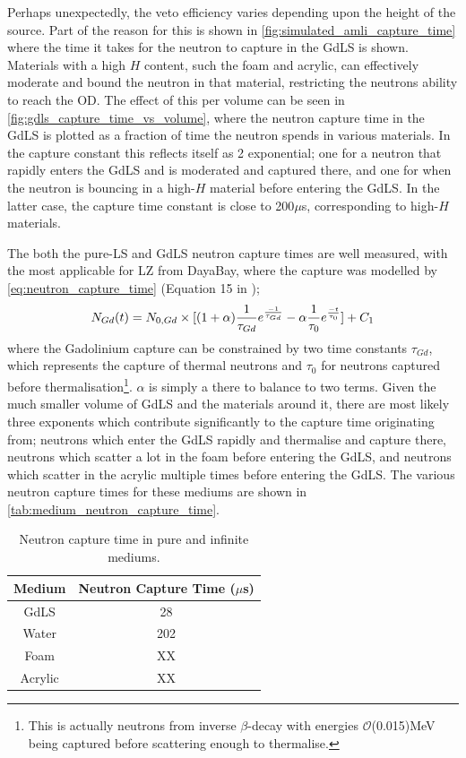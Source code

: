 \par
Perhaps unexpectedly, the veto efficiency varies depending upon the height of the source.
Part of the reason for this is shown in \autoref{fig:simulated_amli_capture_time} where the time it takes for the neutron to capture in the GdLS is shown.
Materials with a high $H$ content, such the foam and acrylic, can effectively moderate and bound the neutron in that material, restricting the neutrons ability to reach the OD.
The effect of this per volume can be seen in \autoref{fig:gdls_capture_time_vs_volume}, where the neutron capture time in the GdLS is plotted as a fraction of time the neutron spends in various materials.
In the capture constant this reflects itself as 2 exponential; one for a neutron that rapidly enters the GdLS and is moderated and captured there, and one for when the neutron is bouncing in a high-$H$ material before entering the GdLS.
In the latter case, the capture time constant is close to 200$\mu$s, corresponding to high-$H$ materials.
\par
The both the pure-LS and GdLS neutron capture times are well measured, with the most applicable for LZ from DayaBay, where the capture was modelled by \autoref{eq:neutron_capture_time} (Equation 15 in \cite{Dayabay_neutron_capture_fit_ref});
\begin{equation}
    N_{Gd}(t) = N_{0,Gd} \times [(1+\alpha)\frac{1}{\tau_{Gd}}e^{\frac{-1}{\tau_{Gd}}} - \alpha\frac{1}{\tau_{0}}e^{\frac{-t}{\tau_{0}}}] + C_{1} \\
\label{eq:neutron_capture_time}
\end{equation}
where the Gadolinium capture can be constrained by two time constants $\tau_{Gd}$, which represents the capture of thermal neutrons and $\tau_{0}$ for neutrons captured before thermalisation\footnote{This is actually neutrons from inverse $\beta$-decay with energies $\mathcal{O}$(0.015)MeV being captured before scattering enough to thermalise.}. 
$\alpha$ is simply a there to balance to two terms.
Given the much smaller volume of GdLS and the materials around it, there are most likely three exponents which contribute significantly to the capture time originating from; neutrons which enter the GdLS rapidly and thermalise and capture there, neutrons which scatter a lot in the foam before entering the GdLS, and neutrons which scatter in the acrylic multiple times before entering the GdLS.
The various neutron capture times for these mediums are shown in \autoref{tab:medium_neutron_capture_time}.
\begin{table}
\centering
\begin{tabular}{c|c}
    Medium  & Neutron Capture Time ($\mu$s)  \\ \hline
    GdLS    & 28 \cite{ucsb_gdls_dicebox_simulations_ref}  \\
    Water   & 202 \cite{snoplus_neutron_capture_time_on_water_ref}  \\
    Foam    & XX   \\
    Acrylic & XX  
\end{tabular}
\caption{Neutron capture time in pure and infinite mediums.}
\label{tab:medium_neutron_capture_time}
\end{table}
